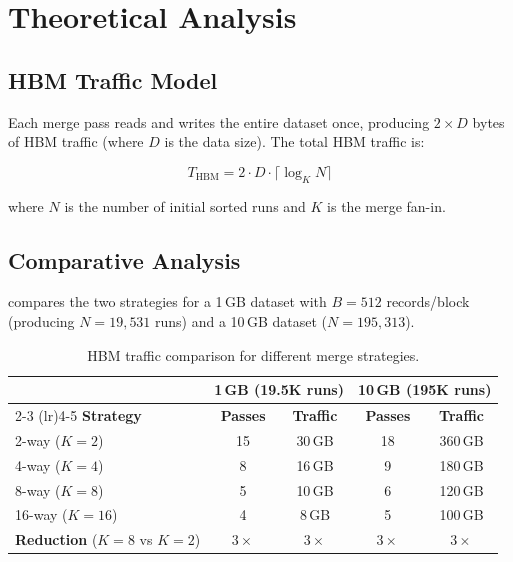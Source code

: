 \documentclass[conference,10pt]{IEEEtran}
\begin{document}
\section{Theoretical Analysis}
\label{sec:analysis}

\subsection{HBM Traffic Model}

Each merge pass reads and writes the entire dataset once, producing
$2 \times D$ bytes of HBM traffic (where $D$ is the data size).  The total
HBM traffic is:

\begin{equation}
  T_{\text{HBM}} = 2 \cdot D \cdot \lceil\log_K N\rceil
  \label{eq:hbm_traffic}
\end{equation}

\noindent where $N$ is the number of initial sorted runs and $K$ is the
merge fan-in.

\subsection{Comparative Analysis}

 compares the two strategies for a 1\,GB dataset with
$B{=}512$ records/block (producing $N{=}19{,}531$ runs) and a 10\,GB
dataset ($N{=}195{,}313$).

\begin{table}[t]
  \centering
  \caption{HBM traffic comparison for different merge strategies.}
  \label{tab:traffic}
  \begin{tabular}{@{}lcccc@{}}
    \toprule
    & \multicolumn{2}{c}{\textbf{1\,GB (19.5K runs)}} & \multicolumn{2}{c}{\textbf{10\,GB (195K runs)}} \\
    \cmidrule(lr){2-3} \cmidrule(lr){4-5}
    \textbf{Strategy} & \textbf{Passes} & \textbf{Traffic} & \textbf{Passes} & \textbf{Traffic} \\
    \midrule
    2-way ($K{=}2$)   & 15 & 30\,GB & 18 & 360\,GB \\
    4-way ($K{=}4$)   &  8 & 16\,GB & 9  & 180\,GB \\
    8-way ($K{=}8$)   &  5 & 10\,GB & 6  & 120\,GB \\
    16-way ($K{=}16$)  &  4 &  8\,GB & 5  & 100\,GB \\
    \midrule
    \textbf{Reduction} ($K{=}8$ vs $K{=}2$) & $3\times$ & $3\times$ & $3\times$ & $3\times$ \\
    \bottomrule
  \end{tabular}
\end{table}
\end{document}
